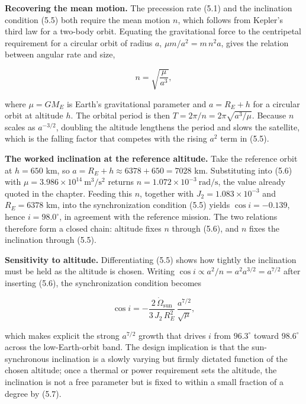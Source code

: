 \documentclass[
  11pt,
  openany,
  oneside]{book}
\begin{document}
\textbf{Recovering the mean motion.} The precession rate (5.1) and the
inclination condition (5.5) both require the mean motion \(n\), which
follows from Kepler's third law for a two-body orbit. Equating the
gravitational force to the centripetal requirement for a circular orbit
of radius \(a\), \(\mu m / a^2 = m\, n^2 a\), gives the relation between
angular rate and size,

\begin{equation}
n = \sqrt{\frac{\mu}{a^3}}, \tag{5.6}
\end{equation}

where \(\mu = G M_E\) is Earth's gravitational parameter and
\(a = R_E + h\) for a circular orbit at altitude \(h\). The orbital
period is then \(T = 2\pi / n = 2\pi\sqrt{a^3/\mu}\). Because \(n\)
scales as \(a^{-3/2}\), doubling the altitude lengthens the period and
slows the satellite, which is the falling factor that competes with the
rising \(a^2\) term in (5.5).

\textbf{The worked inclination at the reference altitude.} Take the
reference orbit at \(h = 650\) km, so
\(a = R_E + h \approx 6378 + 650 = 7028\) km. Substituting into (5.6)
with \(\mu = 3.986\times10^{14}\ \mathrm{m^3/s^2}\) returns
\(n = 1.072\times10^{-3}\ \mathrm{rad/s}\), the value already quoted in
the chapter. Feeding this \(n\), together with
\(J_2 = 1.083\times10^{-3}\) and \(R_E = 6378\) km, into the
synchronization condition (5.5) yields \(\cos i = -0.139\), hence
\(i = 98.0^\circ\), in agreement with the reference mission. The two
relations therefore form a closed chain: altitude fixes \(n\) through
(5.6), and \(n\) fixes the inclination through (5.5).

\textbf{Sensitivity to altitude.} Differentiating (5.5) shows how
tightly the inclination must be held as the altitude is chosen. Writing
\(\cos i \propto a^2 / n = a^2 a^{3/2} = a^{7/2}\) after inserting
(5.6), the synchronization condition becomes

\begin{equation}
\cos i = -\frac{2\,\dot\Omega_{\mathrm{sun}}}{3\, J_2\, R_E^2}\,\frac{a^{7/2}}{\sqrt{\mu}}, \tag{5.7}
\end{equation}

which makes explicit the strong \(a^{7/2}\) growth that drives \(i\)
from \(96.3^\circ\) toward \(98.6^\circ\) across the low-Earth-orbit
band. The design implication is that the sun-synchronous inclination is
a slowly varying but firmly dictated function of the chosen altitude;
once a thermal or power requirement sets the altitude, the inclination
is not a free parameter but is fixed to within a small fraction of a
degree by (5.7).
\end{document}
